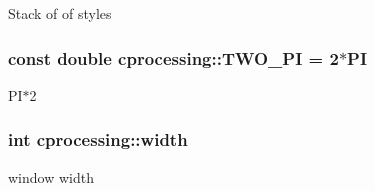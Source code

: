 \-Stack of of styles \hypertarget{namespacecprocessing_aa9c16baaa88d39db100f54cb0bbca62f}{
\subsubsection[{\-T\-W\-O\-\_\-\-P\-I}]{\setlength{\rightskip}{0pt plus 5cm}const double {\bf cprocessing\-::\-T\-W\-O\-\_\-\-P\-I} = 2$\ast${\bf \-P\-I}}}\label{namespacecprocessing_aa9c16baaa88d39db100f54cb0bbca62f}
\-P\-I$\ast$2 \hypertarget{namespacecprocessing_a7af937eb8772235def57fcadd10fc82a}{
\subsubsection[{width}]{\setlength{\rightskip}{0pt plus 5cm}int {\bf cprocessing\-::width}}}\label{namespacecprocessing_a7af937eb8772235def57fcadd10fc82a}


window width 

